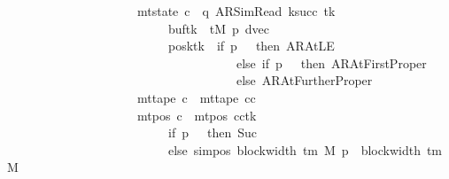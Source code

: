 \begin{isabellebody}
\ \ \ \ \ \ \ \ \ \ \ \ \ \ \ \ \ \ \ \ {\isasymand}\ mt{\isacharunderscore}{\kern0pt}state\ c{\isacharprime}{\kern0pt}{\isacharprime}{\kern0pt}\ {\isacharequal}{\kern0pt}\ {\isacharparenleft}{\kern0pt}q{\isacharcomma}{\kern0pt}\ AR{\isacharunderscore}{\kern0pt}SimRead{\isacharcomma}{\kern0pt}\ k{\isacharunderscore}{\kern0pt}succ\ tk{\isacharprime}{\kern0pt}{\isacharcomma}{\kern0pt}\ {}{\isacharcomma}{\kern0pt}\isanewline
\ \ \ \ \ \ \ \ \ \ \ \ \ \ \ \ \ \ \ \ \ \ \ \ \ \ buf{\isacharprime}{\kern0pt}{\isacharparenleft}{\kern0pt}tk{\isacharprime}{\kern0pt}\ {\isacharcolon}{\kern0pt}{\isacharequal}{\kern0pt}\ tM{\isacharprime}{\kern0pt}\ p{\isacharprime}{\kern0pt}{\isacharparenright}{\kern0pt}{\isacharcomma}{\kern0pt}\ dvec{\isacharcomma}{\kern0pt}\isanewline
\ \ \ \ \ \ \ \ \ \ \ \ \ \ \ \ \ \ \ \ \ \ \ \ \ \ posk{\isacharprime}{\kern0pt}{\isacharparenleft}{\kern0pt}tk{\isacharprime}{\kern0pt}\ {\isacharcolon}{\kern0pt}{\isacharequal}{\kern0pt}\ if\ p{\isacharprime}{\kern0pt}\ {\isacharequal}{\kern0pt}\ {}\ then\ AR{\isacharunderscore}{\kern0pt}AtLE\isanewline
\ \ \ \ \ \ \ \ \ \ \ \ \ \ \ \ \ \ \ \ \ \ \ \ \ \ \ \ \ \ \ \ \ \ \ \ \ else\ if\ p{\isacharprime}{\kern0pt}\ {\isacharequal}{\kern0pt}\ {}\ then\ AR{\isacharunderscore}{\kern0pt}AtFirstProper\isanewline
\ \ \ \ \ \ \ \ \ \ \ \ \ \ \ \ \ \ \ \ \ \ \ \ \ \ \ \ \ \ \ \ \ \ \ \ \ else\ AR{\isacharunderscore}{\kern0pt}AtFurtherProper{\isacharparenright}{\kern0pt}{\isacharparenright}{\kern0pt}\isanewline
\ \ \ \ \ \ \ \ \ \ \ \ \ \ \ \ \ \ \ \ {\isasymand}\ mt{\isacharunderscore}{\kern0pt}tape\ c{\isacharprime}{\kern0pt}{\isacharprime}{\kern0pt}\ {\isacharequal}{\kern0pt}\ mt{\isacharunderscore}{\kern0pt}tape\ cc\isanewline
\ \ \ \ \ \ \ \ \ \ \ \ \ \ \ \ \ \ \ \ {\isasymand}\ mt{\isacharunderscore}{\kern0pt}pos\ c{\isacharprime}{\kern0pt}{\isacharprime}{\kern0pt}\ {\isacharequal}{\kern0pt}\ {\isacharparenleft}{\kern0pt}mt{\isacharunderscore}{\kern0pt}pos\ cc{\isacharparenright}{\kern0pt}{\isacharparenleft}{\kern0pt}tk{\isacharprime}{\kern0pt}\ {\isacharcolon}{\kern0pt}{\isacharequal}{\kern0pt}\isanewline
\ \ \ \ \ \ \ \ \ \ \ \ \ \ \ \ \ \ \ \ \ \ \ \ \ \ if\ p{\isacharprime}{\kern0pt}\ {\isacharequal}{\kern0pt}\ {}\ then\ Suc\ {}\isanewline
\ \ \ \ \ \ \ \ \ \ \ \ \ \ \ \ \ \ \ \ \ \ \ \ \ \ else\ sim{\isacharunderscore}{\kern0pt}pos\ {\isacharparenleft}{\kern0pt}block{\isacharunderscore}{\kern0pt}width\ {\isacharparenleft}{\kern0pt}{\isasymGamma}{\isacharunderscore}{\kern0pt}tm\ M{\isacharparenright}{\kern0pt}{\isacharparenright}{\kern0pt}\ p{\isacharprime}{\kern0pt}\ {\isacharplus}{\kern0pt}\ block{\isacharunderscore}{\kern0pt}width\ {\isacharparenleft}{\kern0pt}{\isasymGamma}{\isacharunderscore}{\kern0pt}tm\ M{\isacharparenright}{\kern0pt}{\isacharparenright}{\kern0pt}{\isachardoublequoteclose}\isanewline

\end{isabellebody}
